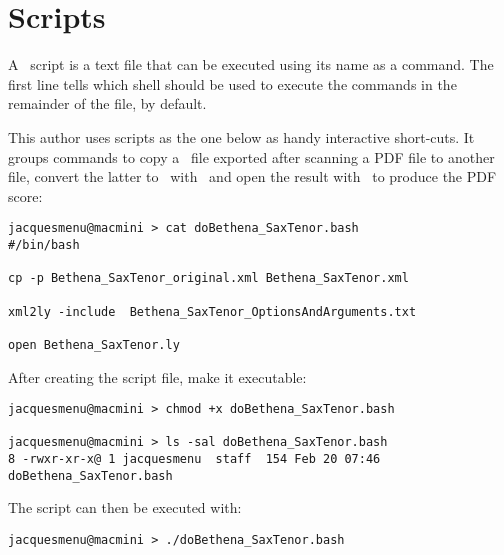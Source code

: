 \section{Scripts}

A \shell\ script is a text file that can be executed using its name as a command. The first line tells which shell should be used to execute the commands in the remainder of the file,  by default.

This author uses scripts as the one below as handy interactive short-cuts. It groups commands to copy a \mxml\ file exported after scanning a PDF file to another file, convert the latter to \lily\ with \xmlToLy\ and open the result with \fresco\ to produce the PDF score:
\begin{lstlisting}[language=Terminal]
jacquesmenu@macmini > cat doBethena_SaxTenor.bash 
#/bin/bash

cp -p Bethena_SaxTenor_original.xml Bethena_SaxTenor.xml

xml2ly -include  Bethena_SaxTenor_OptionsAndArguments.txt

open Bethena_SaxTenor.ly
\end{lstlisting}

After creating the script file, make it executable:
\begin{lstlisting}[language=Terminal]
jacquesmenu@macmini > chmod +x doBethena_SaxTenor.bash

jacquesmenu@macmini > ls -sal doBethena_SaxTenor.bash 
8 -rwxr-xr-x@ 1 jacquesmenu  staff  154 Feb 20 07:46 doBethena_SaxTenor.bash
\end{lstlisting}

The script can then be executed with:
\begin{lstlisting}[language=Terminal]
jacquesmenu@macmini > ./doBethena_SaxTenor.bash 
\end{lstlisting}


